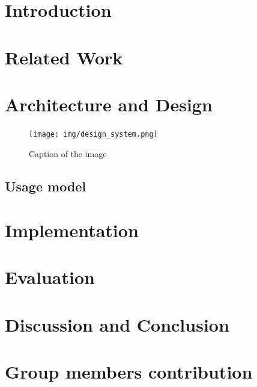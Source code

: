 \documentclass[12pt]{report}
\begin{document}
\section*{Introduction}

\section*{Related Work}

\section*{Architecture and Design}
\begin{figure}[htbp]
  \centering
  \texttt{[image: img/design\_system.png]}
  \caption{Caption of the image}
  \label{fig:image_label}
\end{figure}
\subsection*{Usage model}

\section*{Implementation}

\section*{Evaluation}

\section*{Discussion and Conclusion}

\section*{Group members contribution}

\newpage
\printbibliography
{}
\end{document}
